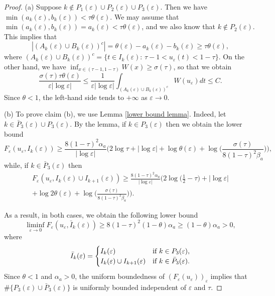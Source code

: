 \documentclass[12pt]{article}
\numberwithin{equation}{section}
\begin{document}
\begin{proof} 
(a) Suppose $k\notin P_{1}(\varepsilon)\cup P_{2}(\varepsilon)\cup P_{3}(\varepsilon)$. Then we have 
$\min(a_{k}(\varepsilon),b_{k}(\varepsilon))<\tau\theta(\varepsilon)$. 
We may assume that 
$\min(a_{k}(\varepsilon),b_{k}(\varepsilon))=a_{k}(\varepsilon)<\tau\theta(\varepsilon)
$,
and we also know that $k\notin P_{2}(\varepsilon)$. This implies that 
\[
|(A_{k}(\varepsilon)\cup B_{k}(\varepsilon))^{c}|=\theta(\varepsilon)-a_{k}(\varepsilon)-b_{k}(\varepsilon)\ge\tau\theta(\varepsilon),
\]
where $(A_{k}(\varepsilon)\cup B_{k}(\varepsilon))^{c}=\{t\in I_{k}(\varepsilon):\,\tau-1<u_{\varepsilon}(t)<1-\tau\}$. On the other hand, we have $
\inf_{x\in(\tau-1,1-\tau)}W(x)\ge\sigma(\tau)$, so that we obtain 
\[
\frac{\sigma(\tau)\tau\theta(\varepsilon)}{\varepsilon|\log{\varepsilon}|}\le\frac{1}{\varepsilon|\log{\varepsilon}|}\int_{(A_{k}(\varepsilon)\cup B_{k}(\varepsilon))^{c}}W(u_{\varepsilon})dt\le C.
\]
Since $\theta<1$, the left-hand side tends to $+\infty$ as $\varepsilon\to0$. 

\smallskip
(b) To prove claim (b), we use Lemma \ref{lower bound lemma}.
Indeed, let  $k\in \bar{P}_{3}(\varepsilon)\cup P_{3}(\varepsilon)$. By the lemma, if $k\in P_{3}(\varepsilon)$ then we obtain the lower bound 
\begin{equation*}
    F_{\varepsilon}(u_\varepsilon,I_{k}(\varepsilon))
\ge
\frac{8(1-\tau)^2\alpha_{a}}{\left|\log\varepsilon\right|}
\Big(
2\log\tau
+
|\log\varepsilon|
+\log{\theta(\varepsilon)}+
\log
\Big(
\frac{\sigma(\tau)}
{8(1-\tau)^2\beta_{a}}
\Big)
\Big),
\end{equation*}
while, if $k\in\bar{P}_{3}(\varepsilon)$ then
\begin{multline*}
     F_{\varepsilon}(u_\varepsilon,I_{k}(\varepsilon)\cup I_{k+1}(\varepsilon))
\ge
\frac{8(1-\tau)^2\alpha_{a}}{\left|\log\varepsilon\right|}
\Big(2\log{\Big(\frac{1}{2}-\tau\Big)}
+|\log\varepsilon|
\\+\log{2\theta(\varepsilon)}+
\log\Big(\frac{\sigma(\tau)}{8(1-\tau)^2\beta_{a}}\Big)\Big).
\end{multline*}

As a result, in both cases, we obtain the following lower bound
\begin{equation*}
     \liminf_{\varepsilon\to0}F_{\varepsilon}(u_\varepsilon,\bar{I}_{k}(\varepsilon))\ge8(1-\tau)^2(1-\theta)\alpha_{a}\ge(1-\theta)\alpha_{a}>0,
\end{equation*}
where 
\[
\bar{I}_{k}(\varepsilon)=\begin{cases}
    I_{k}(\varepsilon) & \hbox{if}\,\, k\in P_{3}(\varepsilon),\\
    I_{k}(\varepsilon)\cup I_{k+1}(\varepsilon) & \hbox{if}\,\, k\in \bar{P}_{3}(\varepsilon).
\end{cases}
\]
Since $\theta<1$ and $\alpha_{a}>0$, the uniform boundedness of $\left(F_{\varepsilon}(u_\varepsilon)\right)_{\varepsilon}$ implies that $\#\{P_{3}(\varepsilon)\cup \bar{P}_{3}(\varepsilon)\}$ is uniformly bounded independent of $\varepsilon$ and $\tau$.  
\end{proof}
\end{document}
